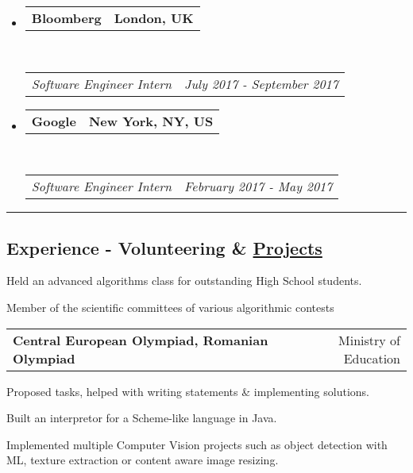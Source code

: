 \documentclass[10pt,letterpaper]{article}
\makeatletter
\newcommand{\headerrow}[2]
{\begin{tabular*}{\linewidth}{l@{\extracolsep{\fill}}r}
	#1 &
	#2 \\
\end{tabular*}}
\makeatother
\begin{document}
\begin{itemize}
	\item
	\headerrow
		{\textbf{Bloomberg}}
		{\textbf{London, UK}}
	\\
	\headerrow
		{\emph{Software Engineer Intern}}
		{\emph{July 2017 - September 2017}}

	\item
	\headerrow
		{\textbf{Google}}
		{\textbf{New York, NY, US}}
	\\
	\headerrow
		{\emph{Software Engineer Intern}}
		{\emph{February 2017 - May 2017}}
\end{itemize}

\hrule
\vspace{-1em}

\subsection*{Experience - Volunteering \& \href{https://github.com/ericpts}{Projects}}

\vspace{-0.4em}

\begin{itemize*}

	\item Held an advanced algorithms class for outstanding High School students.

	\item
		{Member of the scientific committees of various algorithmic contests}

	\headerrow
		{\textbf{Central European Olympiad, Romanian Olympiad}}
		{Ministry of Education}

\vspace{-0.6em}

	\begin{itemize*}
		\item Proposed tasks, helped with writing statements \& implementing solutions.
	\end{itemize*}

\vspace{-0.6em}

    \item Built an interpretor for a Scheme-like language in Java.
    \item Implemented multiple Computer Vision projects such as object detection with ML, texture extraction or content aware image resizing.
\end{itemize*}
\end{document}
